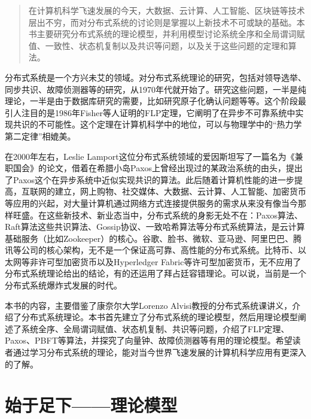 \documentclass[UTF8,AutoFakeBold=1,AutoFakeSlant,zihao=-4]{cucthesis}
\begin{document}
\coverpage

\begin{abstract}
在计算机科学飞速发展的今天，大数据、云计算、人工智能、区块链等技术层出不穷，而对分布式系统的讨论则是掌握以上新技术不可或缺的基础。本书主要研究分布式系统的理论模型，并利用模型讨论系统全序和全局谓词赋值、一致性、状态机复制以及共识等问题，以及关于这些问题的定理和算法。
\end{abstract}

\begin{abstractEN}
分布式系统是一个方兴未艾的领域。对分布式系统理论的研究，包括对领导选举、同步共识、故障侦测器等的研究，从1970年代就开始了。研究这些问题，一半是纯理论，一半是由于数据库研究的需要，比如研究原子化确认问题等等。这个阶段最引人注目的是1986年Fisher等人证明的FLP定理，它阐明了在异步不可靠系统中实现共识的不可能性。这个定理在计算机科学中的地位，可以与物理学中的“热力学第二定律”相媲美。

在2000年左右，Leslie Lamport这位分布式系统领域的爱因斯坦写了一篇名为《兼职国会》的论文，借着在希腊小岛Paxos上曾经出现过的某政治系统的由头，提出了Paxos这个在异步系统中近似实现共识的算法。此后随着计算机性能的进一步提高，互联网的建立，网上购物、社交媒体、大数据、云计算、人工智能、加密货币等应用的兴起，对大量计算机通过网络方式连接提供服务的需求从来没有像当今那样旺盛。在这些新技术、新业态当中，分布式系统的身影无处不在：Paxos算法、Raft算法这些共识算法、Gossip协议、一致哈希算法等分布式系统算法，是云计算基础服务（比如Zookeeper）的核心。谷歌、脸书、微软、亚马逊、阿里巴巴、腾讯等公司的核心架构，无不是一个保证高可靠、高性能的分布式系统。比特币、以太网等非许可型加密货币以及Hyperledger Fabric等许可型加密货币，无不应用了分布式系统理论给出的结论，有的还运用了拜占廷容错理论。可以说，当前是一个分布式系统爆炸式发展的时代。

本书的内容，主要借鉴了康奈尔大学Lorenzo Alvisi教授的分布式系统课讲义，介绍了分布式系统理论。本书首先建立了分布式系统的理论模型，然后用理论模型阐述了系统全序、全局谓词赋值、状态机复制、共识等问题，介绍了FLP定理、Paxos、PBFT等算法，并探究了向量钟、故障侦测器等有用的理论模型。希望读者通过学习分布式系统的理论，能对当今世界飞速发展的计算机科学应用有更深入的了解。


\end{abstractEN}

\contentpage

\section{始于足下——理论模型}
\end{document}
